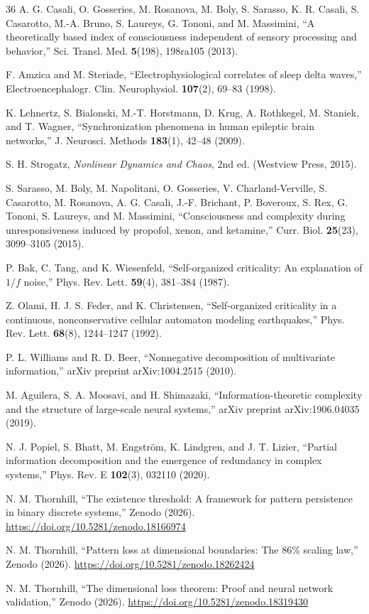 \documentclass[12pt,a4paper]{article}
\begin{document}
\begin{thebibliography}{36}
 A. G. Casali, O. Gosseries, M. Rosanova, M. Boly, S. Sarasso, K. R. Casali, S. Casarotto, M.-A. Bruno, S. Laureys, G. Tononi, and M. Massimini, ``A theoretically based index of consciousness independent of sensory processing and behavior,'' Sci. Transl. Med. \textbf{5}(198), 198ra105 (2013).

 F. Amzica and M. Steriade, ``Electrophysiological correlates of sleep delta waves,'' Electroencephalogr. Clin. Neurophysiol. \textbf{107}(2), 69--83 (1998).

 K. Lehnertz, S. Bialonski, M.-T. Horstmann, D. Krug, A. Rothkegel, M. Staniek, and T. Wagner, ``Synchronization phenomena in human epileptic brain networks,'' J. Neurosci. Methods \textbf{183}(1), 42--48 (2009).

 S. H. Strogatz, \emph{Nonlinear Dynamics and Chaos}, 2nd ed. (Westview Press, 2015).

 S. Sarasso, M. Boly, M. Napolitani, O. Gosseries, V. Charland-Verville, S. Casarotto, M. Rosanova, A. G. Casali, J.-F. Brichant, P. Boveroux, S. Rex, G. Tononi, S. Laureys, and M. Massimini, ``Consciousness and complexity during unresponsiveness induced by propofol, xenon, and ketamine,'' Curr. Biol. \textbf{25}(23), 3099--3105 (2015).

 P. Bak, C. Tang, and K. Wiesenfeld, ``Self-organized criticality: An explanation of $1/f$ noise,'' Phys. Rev. Lett. \textbf{59}(4), 381--384 (1987).

 Z. Olami, H. J. S. Feder, and K. Christensen, ``Self-organized criticality in a continuous, nonconservative cellular automaton modeling earthquakes,'' Phys. Rev. Lett. \textbf{68}(8), 1244--1247 (1992).

 P. L. Williams and R. D. Beer, ``Nonnegative decomposition of multivariate information,'' arXiv preprint arXiv:1004.2515 (2010).

 M. Aguilera, S. A. Moosavi, and H. Shimazaki, ``Information-theoretic complexity and the structure of large-scale neural systems,'' arXiv preprint arXiv:1906.04035 (2019).

 N. J. Popiel, S. Bhatt, M. Engstr{\"o}m, K. Lindgren, and J. T. Lizier, ``Partial information decomposition and the emergence of redundancy in complex systems,'' Phys. Rev. E \textbf{102}(3), 032110 (2020).

 N. M. Thornhill, ``The existence threshold: A framework for pattern persistence in binary discrete systems,'' Zenodo (2026). \url{https://doi.org/10.5281/zenodo.18166974}

 N. M. Thornhill, ``Pattern loss at dimensional boundaries: The 86\% scaling law,'' Zenodo (2026). \url{https://doi.org/10.5281/zenodo.18262424}

 N. M. Thornhill, ``The dimensional loss theorem: Proof and neural network validation,'' Zenodo (2026). \url{https://doi.org/10.5281/zenodo.18319430}

\end{thebibliography}
\end{document}
